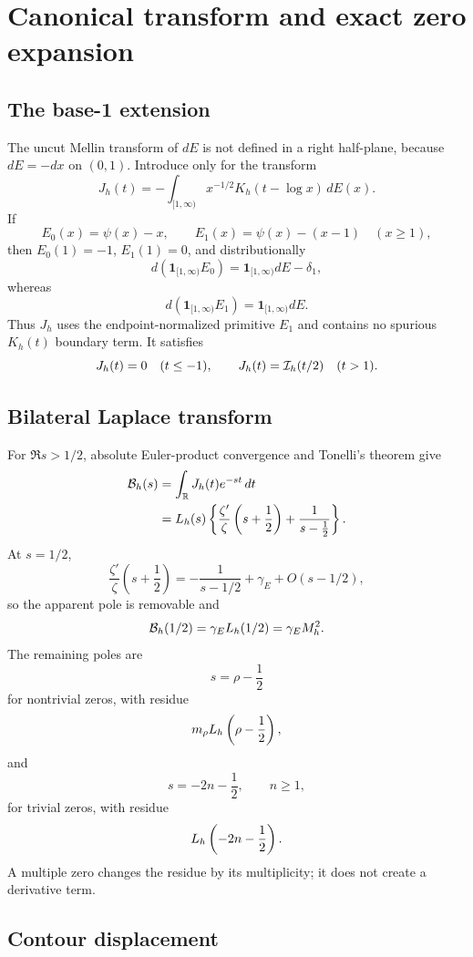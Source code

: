 \section{Canonical transform and exact zero expansion}
\label{sec:explicit}

\subsection{The base-1 extension}

The uncut Mellin transform of \(dE\) is not defined in a right half-plane,
because \(dE=-dx\) on \((0,1)\).  Introduce only for the transform
\[
J_h(t)=
-\int_{[1,\infty)}
x^{-1/2}K_h(t-\log x)\,dE(x).
\]
If
\[
E_0(x)=\psi(x)-x,\qquad
E_1(x)=\psi(x)-(x-1)\quad(x\ge1),
\]
then \(E_0(1)=-1\), \(E_1(1)=0\), and distributionally
\[
d(\mathbf1_{[1,\infty)}E_0)
=\mathbf1_{[1,\infty)}dE-\delta_1,
\]
whereas
\[
d(\mathbf1_{[1,\infty)}E_1)
=\mathbf1_{[1,\infty)}dE.
\]
Thus \(J_h\) uses the endpoint-normalized primitive \(E_1\) and contains no
spurious \(K_h(t)\) boundary term.  It satisfies
\[
J_h(t)=0\quad(t\le-1),\qquad
J_h(t)=\mathcal I_h(t/2)\quad(t>1).
\]

\subsection{Bilateral Laplace transform}

For \(\Re s>1/2\), absolute Euler-product convergence and Tonelli's theorem
give
\begin{align}
\mathcal B_h(s)
&=
\int_\mathbb R J_h(t)e^{-st}\,dt
\notag\\
&=
L_h(s)
\left\{
\frac{\zeta'}{\zeta}\left(s+\frac12\right)
+\frac{1}{s-\frac12}
\right\}.
\label{eq:B-transform}
\end{align}
At \(s=1/2\),
\[
\frac{\zeta'}{\zeta}\left(s+\frac12\right)
=-\frac{1}{s-1/2}+\gamma_E+O(s-1/2),
\]
so the apparent pole is removable and
\[
\mathcal B_h(1/2)=\gamma_EL_h(1/2)=\gamma_E M_h^2.
\]
The remaining poles are
\[
s=\rho-\frac12
\]
for nontrivial zeros, with residue
\[
m_\rho L_h\left(\rho-\frac12\right),
\]
and
\[
s=-2n-\frac12,\qquad n\ge1,
\]
for trivial zeros, with residue
\[
L_h\left(-2n-\frac12\right).
\]
A multiple zero changes the residue by its multiplicity; it does not create
a derivative term.

\subsection{Contour displacement}

